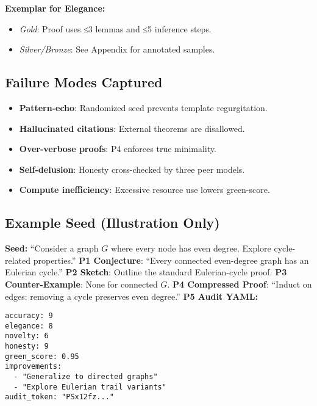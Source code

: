 \textbf{Exemplar for Elegance:}
\begin{itemize}
  \item \emph{Gold}: Proof uses ≤3 lemmas and ≤5 inference steps.
  \item \emph{Silver/Bronze}: See Appendix for annotated samples.
\end{itemize}

\subsection*{Failure Modes Captured}
\begin{itemize}
  \item \textbf{Pattern-echo}: Randomized seed prevents template regurgitation.
  \item \textbf{Hallucinated citations}: External theorems are disallowed.
  \item \textbf{Over-verbose proofs}: P4 enforces true minimality.
  \item \textbf{Self-delusion}: Honesty cross-checked by three peer models.
  \item \textbf{Compute inefficiency}: Excessive resource use lowers green-score.
\end{itemize}

\subsection*{Example Seed (Illustration Only)}
\textbf{Seed:} “Consider a graph $G$ where every node has even degree. Explore cycle-related properties.”  
\textbf{P1 Conjecture}: “Every connected even-degree graph has an Eulerian cycle.”  
\textbf{P2 Sketch}: Outline the standard Eulerian-cycle proof.  
\textbf{P3 Counter-Example}: None for connected $G$.  
\textbf{P4 Compressed Proof}: “Induct on edges: removing a cycle preserves even degree.”  
\textbf{P5 Audit YAML:}
\begin{verbatim}
accuracy: 9
elegance: 8
novelty: 6
honesty: 9
green_score: 0.95
improvements:
  - "Generalize to directed graphs"
  - "Explore Eulerian trail variants"
audit_token: "PSx12fz..."
\end{verbatim}